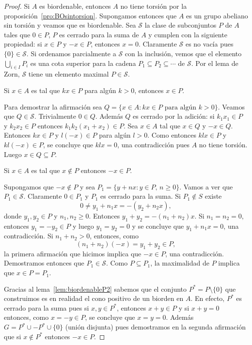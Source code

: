 \begin{proof}
	Si $A$ es biordenable, entonces $A$ no tiene torsión por la
	proposición~\ref{pro:BOsintorsion}. Supongamos entonces que $A$ es un grupo
	abeliano sin torsión y veamos que es biordenable.  Sea $\mathcal{S}$ la
	clase de subconjuntos $P$ de $A$ tales que $0\in P$, $P$ es cerrado para la
	suma de $A$ y cumplen con la siguiente propiedad: si $x\in P$ y $-x\in P$,
	entonces $x=0$.
	Claramente $\mathcal{S}$ es no vacía pues
	$\{0\}\in\mathcal{S}$.  Si ordenamos parcialmente a $\mathcal{S}$ con la
	inclusión, vemos que el elemento $\bigcup_{i\in I}P_i$ es una cota superior
	para la cadena $P_1\subseteq P_2\subseteq\cdots$ de $\mathcal{S}$. Por el
	lema de Zorn, $\mathcal{S}$ tiene un elemento maximal $P\in\mathcal{S}$.

	\begin{claim}
		Si $x\in A$ es tal que $kx\in P$ para algún $k>0$, entonces $x\in P$.		
	\end{claim}

	Para demostrar la afirmación sea $Q=\{x\in A:kx\in P\text{ para algún
	$k>0$}\}$. Veamos que $Q\in\mathcal{S}$.  Trivialmente $0\in Q$. Además $Q$
	es cerrado por la adición: si $k_1x_1\in P$ y $k_2x_2\in P$ entonces
	$k_1k_2(x_1+x_2)\in P$. Sea $x\in A$ tal que $x\in Q$ y $-x\in Q$. Entonces
	$kx\in P$ y $l(-x)\in P$ para algún $l>0$. Como entonces $klx\in P$ y
	$kl(-x)\in P$, se concluye que $klx=0$, una contradicción pues $A$ no tiene
	torsión. Luego $x\in Q\subseteq P$. 

	\begin{claim}
		Si $x\in A$ es tal que $x\not\in P$ entonces $-x\in P$. 	
	\end{claim}

	Supongamos que $-x\not\in P$ y sea $P_1=\{y+nx:y\in P,\,n\geq0\}$. Vamos a
	ver que $P_1\in\mathcal{S}$.  Claramente $0\in P_1$ y $P_1$ es cerrado para
	la suma. Si $P_1\not\in S$ 
	existe 
	\[
		0\ne y_1+n_1x=-(y_2+n_2x),
	\]
	donde $y_1,y_2\in P$ y $n_1,n_2\geq0$. Entonces $y_1+y_2=-(n_1+n_2)x$. Si
	$n_1=n_2=0$, entonces $y_1=-y_2\in P$ y luego $y_1=y_2=0$ y se concluye que
	$y_1+n_1x=0$, una contradicción. Si $n_1+n_2>0$, entonces, como 
	\[
		(n_1+n_2)(-x)=y_1+y_2\in P,
	\]
	la primera afirmación que hicimos implica que $-x\in P$, una contradicción. 
	Demostramos entonces que $P_1\in\mathcal{S}$. 
	Como $P\subseteq P_1$, la maximalidad de $P$ implica que 
	$x\in P=P_1$.

	\medskip
	Gracias al lema~\ref{lem:biordenableP2} sabemos que el conjunto
	$P^*=P\setminus\{0\}$ que construimos es en realidad el cono positivo de un
	biorden en $A$. En efecto, $P^*$ es cerrado para la suma pues si $x,y\in
	P^*$, entonces $x+y\in P$ y si $x+y=0$ entonces, como $x=-y\in P$, se
	concluye que $x=y=0$. Además $G=P^*\cup -P^*\cup\{0\}$ (unión disjunta)
	pues demostramos en la segunda afirmación que si $x\not\in P^*$ entonces
	$-x\in P$. 
\end{proof}

